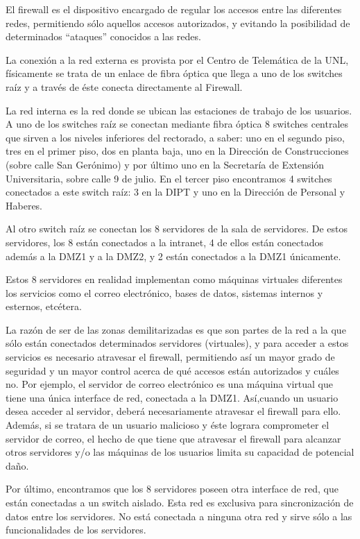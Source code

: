 \documentclass[a4paper,11pt,oneside]{article}
\begin{document}
El firewall es el dispositivo encargado de regular los accesos entre
las diferentes redes, permitiendo sólo aquellos accesos autorizados, y
evitando la posibilidad de determinados ``ataques'' conocidos a las
redes.

La conexión a la red externa es provista por el Centro de Telemática
de la UNL, físicamente se trata de un enlace de fibra óptica que llega
a uno de los switches raíz y a través de éste conecta directamente al
Firewall.

La red interna es la red donde se ubican las estaciones de trabajo de
los usuarios.  A uno de los switches raíz se conectan mediante fibra
óptica 8 switches centrales que sirven a los niveles inferiores del
rectorado, a saber: uno en el segundo piso, tres en el primer piso,
dos en planta baja, uno en la Dirección de Construcciones (sobre calle
San Gerónimo) y por último uno en la Secretaría de Extensión
Universitaria, sobre calle 9 de julio. En el tercer piso encontramos 4
switches conectados a este switch raíz: 3 en la DIPT y uno en la
Dirección de Personal y Haberes.

Al otro switch raíz se conectan los 8 servidores de la sala de
servidores.  De estos servidores, los 8 están conectados a la
intranet, 4 de ellos están conectados además a la DMZ1 y a la DMZ2, y
2 están conectados a la DMZ1 únicamente.

Estos 8 servidores en realidad implementan como máquinas virtuales
diferentes los servicios como el correo electrónico, bases de datos,
sistemas internos y esternos, etcétera.

La razón de ser de las zonas demilitarizadas es que son partes de la
red a la que sólo están conectados determinados servidores
(virtuales), y para acceder a estos servicios es necesario atravesar
el firewall, permitiendo así un mayor grado de seguridad y un mayor
control acerca de qué accesos están autorizados y cuáles no. Por
ejemplo, el servidor de correo electrónico es una máquina virtual que
tiene una única interface de red, conectada a la DMZ1. Así,cuando un
usuario desea acceder al servidor, deberá necesariamente atravesar el
firewall para ello. Además, si se tratara de un usuario malicioso y
éste lograra comprometer el servidor de correo, el hecho de que tiene
que atravesar el firewall para alcanzar otros servidores y/o las
máquinas de los usuarios limita su capacidad de potencial daño.

Por último, encontramos que los 8 servidores poseen otra interface de
red, que están conectadas a un switch aislado. Esta red es exclusiva
para sincronización de datos entre los servidores. No está conectada a
ninguna otra red y sirve sólo a las funcionalidades de los servidores.
\end{document}
